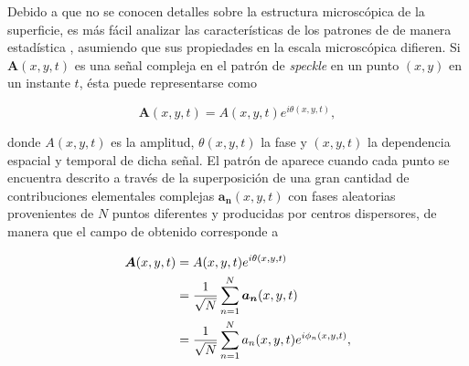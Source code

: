 Debido a que no se conocen detalles sobre la estructura microscópica de la superficie, es más fácil analizar las características de los patrones de \speckle de manera estadística \cite{Dainty1975}, asumiendo que sus propiedades en la escala microscópica difieren. Si $\boldsymbol{A}(x,y,t)$ es una señal compleja en el patrón de \textit{speckle} en un punto $(x,y)$ en un instante $t$, ésta puede representarse como


\begin{equation}
\boldsymbol{A}(x,y,t) = A(x,y,t)e^{i\theta(x,y,t)},
\end{equation}

\noindent donde $A(x,y,t)$ es la amplitud, $\theta(x,y,t)$ la fase y $(x,y,t)$ la dependencia espacial y temporal de dicha señal. El patrón de \speckle aparece cuando cada punto se encuentra descrito a través de la superposición de una gran cantidad de contribuciones elementales complejas $\boldsymbol{a_n}(x,y,t)$ con fases aleatorias provenientes de $N$ puntos diferentes y producidas por centros dispersores, de manera que el campo de \speckle obtenido corresponde a 

\begin{align}
\boldsymbol{A}(x,y,t) &= A(x,y,t)e^{i\theta(x,y,t)} \notag\\ 
&= \frac{1}{\sqrt{N}}\sum_{n=1}^{N} \boldsymbol{a_n}(x,y,t) \notag\\
&= \frac{1}{\sqrt{N}}\sum_{n=1}^{N} a_n(x,y,t) e^{i\phi_n(x,y,t)},
\end{align}


